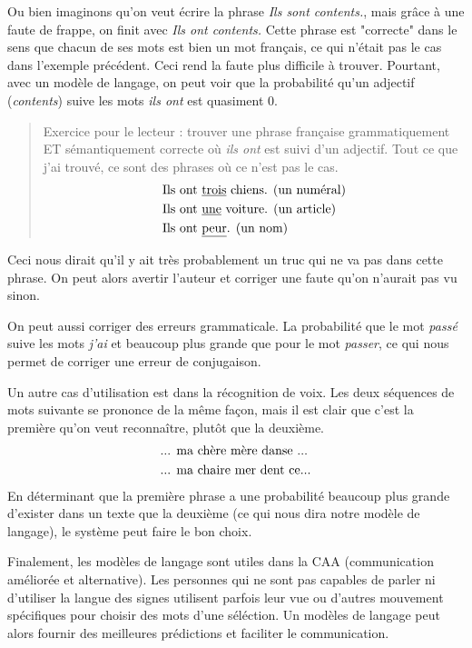 \documentclass[11pt, a4paper]{report}
\begin{document}
  Ou bien imaginons qu'on veut écrire 
  la phrase \textit{Ils sont contents.}, mais grâce à une faute de frappe, on finit avec 
  \textit{Ils ont contents.} Cette phrase est "correcte" dans le sens que chacun de ses mots 
  est bien un mot français, ce qui n'était pas le cas dans l'exemple précédent.
  Ceci rend la faute plus difficile à trouver. Pourtant, avec un modèle de langage, 
  on peut voir que la probabilité qu'un adjectif (\textit{contents}) suive 
  les mots \textit{ils ont} est quasiment 0. 
  \begin{quote}
    Exercice pour le lecteur : trouver une phrase 
    française grammatiquement ET sémantiquement correcte où \textit{ils ont} est suivi d'un 
    adjectif. Tout ce que j'ai trouvé, ce sont des phrases où ce n'est pas le cas. 
    \begin{align*}
      &\textup{Ils ont \underline{trois} chiens. (un numéral)}\\
      &\textup{Ils ont \underline{une} voiture. (un article)}\\
      &\textup{Ils ont \underline{peur}. (un nom)}
    \end{align*}
  \end{quote} 
  Ceci nous dirait qu'il y ait très probablement un truc qui ne va pas dans cette phrase. 
  On peut alors avertir l'auteur et corriger une faute qu'on n'aurait pas vu sinon. 

  On peut aussi corriger des erreurs grammaticale. La probabilité que le mot 
  \textit{passé} suive les mots \textit{j'ai} et beaucoup plus grande que 
  pour le mot \textit{passer}, ce qui nous permet de corriger une erreur de conjugaison. 
  

  Un autre cas d'utilisation est dans la récognition de voix. Les deux séquences de mots
  suivante se prononce de la même façon, mais il est clair que c'est la première qu'on veut 
  reconnaître, plutôt que la deuxième. 
  \begin{align*}
    &\textup{... ma chère mère danse ...}\\
    &\textup{... ma chaire mer dent ce}...\\
  \end{align*}
  En déterminant que la première phrase a une probabilité beaucoup plus grande d'exister 
  dans un texte que la deuxième (ce qui nous dira notre modèle de langage), 
  le système peut faire le bon choix. 

  Finalement, les modèles de langage sont utiles dans la CAA (communication améliorée et 
  alternative). Les personnes qui ne sont pas capables de parler ni d'utiliser la langue des 
  signes utilisent parfois leur vue ou d'autres mouvement spécifiques pour choisir des mots 
  d'une séléction. Un modèles de langage peut alors fournir des meilleures prédictions et 
  faciliter le communication. 
\end{document}
